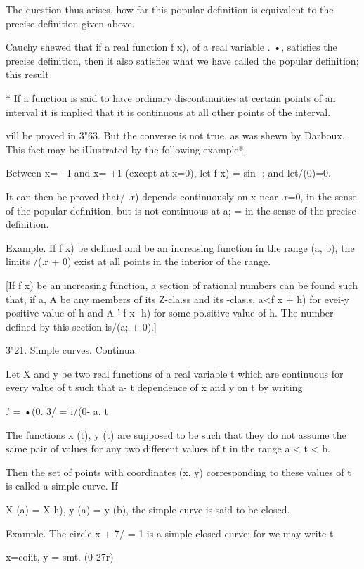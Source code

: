 The question thus arises, how far this popular definition is
equivalent to the precise definition given above.

Cauchy shewed that if a real function f x), of a real variable . •,
satisfies the precise definition, then it also satisfies what we have
called the popular definition; this result

* If a function is said to have ordinary discontinuities at certain
points of an interval it is implied that it is continuous at all other
points of the interval.

%
%

vill be proved in 3"63. But the converse is not true, as was shewn by
Darboux. This fact may be iUustrated by the following example*.

Between x= - I and x= +1 (except at x=0), let f x) = sin -; and
let/(0)=0.

It can then be proved that/ .r) depends continuously on x near .r=0,
in the sense of the popular definition, but is not continuous at a; =
in the sense of the precise definition.

Example. If f x) be defined and be an increasing function in the range
(a, b), the limits /(.r + 0) exist at all points in the interior of
the range.

[If f x) be an increasing function, a section of rational numbers can
be found such that, if a, A be any members of its Z-cla.ss and its
-clas.s, a<f x + h) for evei-y positive value of h and A ' f x- h) for
some po.sitive value of h. The number defined by this section is/(a; +
0).]

3"21. Simple curves. Continua.

Let X and y be two real functions of a real variable t which are
continuous for every value of t such that a- t %
dependence of x and y on t by writing

.' = •(0. 3/ = i/(0- a. t%

The functions x (t), y (t) are supposed to be such that they do not
assume the same pair of values for any two different values of t in
the range a < t < b.

Then the set of points with coordinates (x, y) corresponding to these
values of t is called a simple curve. If

X (a) = X h), y (a) = y (b), the simple curve is said to be closed.

Example. The circle x + 7/-= 1 is a simple closed curve; for we may
write t

x=coiit, y = smt. (0 27r)

